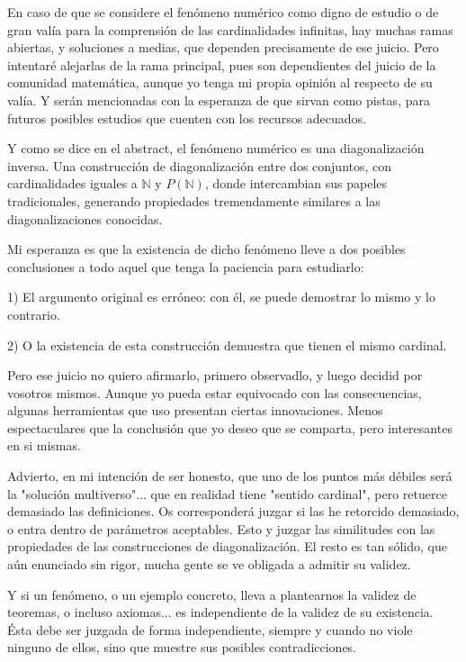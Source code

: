 En caso de que se considere el fenómeno numérico como digno de estudio o de gran valía para la comprensión de las cardinalidades infinitas, hay muchas ramas abiertas, y soluciones a medias, que dependen precisamente de ese juicio. Pero intentaré alejarlas de la rama principal, pues son dependientes del juicio de la comunidad matemática, aunque yo tenga mi propia opinión al respecto de su valía. Y serán mencionadas con la esperanza de que sirvan como pistas, para futuros posibles estudios que cuenten con los recursos adecuados.

Y como se dice en el abstract, el fenómeno numérico es una diagonalización inversa. Una construcción de diagonalización entre dos conjuntos, con cardinalidades iguales a $\mathbb{N}$ y $P(\mathbb{N})$, donde intercambian sus papeles tradicionales, generando propiedades tremendamente similares a las diagonalizaciones conocidas.

Mi esperanza es que la existencia de dicho fenómeno lleve a dos posibles conclusiones a todo aquel que tenga la paciencia para estudiarlo:

1) El argumento original es erróneo: con él, se puede demostrar lo mismo y lo contrario.

2) O la existencia de esta construcción demuestra que tienen el mismo cardinal.

Pero ese juicio no quiero afirmarlo, primero observadlo, y luego decidid por vosotros mismos. Aunque yo pueda estar equivocado con las consecuencias, algunas herramientas que uso presentan ciertas innovaciones. Menos espectaculares que la conclusión que yo deseo que se comparta, pero interesantes en si mismas.

Advierto, en mi intención de ser honesto, que uno de los puntos más débiles será la "solución multiverso"... que en realidad tiene "sentido cardinal", pero retuerce demasiado las definiciones. Os corresponderá juzgar si las he retorcido demasiado, o entra dentro de parámetros aceptables. Esto y juzgar las similitudes con las propiedades de las construcciones de diagonalización. El resto es tan sólido, que aún enunciado sin rigor, mucha gente se ve obligada a admitir su validez.

Y si un fenómeno, o un ejemplo concreto, lleva a plantearnos la validez de teoremas, o incluso axiomas... es independiente de la validez de su existencia. Ésta debe ser juzgada de forma independiente, siempre y cuando no viole ninguno de ellos, sino que muestre sus posibles contradicciones. 


